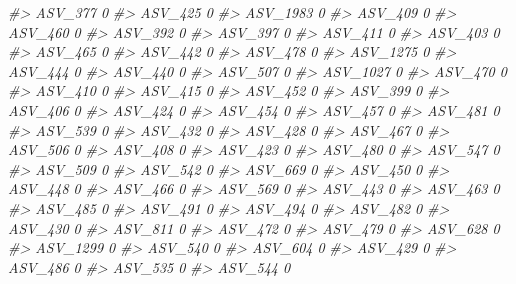 \documentclass[
]{article}
\newenvironment{Shaded}{\begin{snugshade}}{\end{snugshade}}
\newcommand{\CommentTok}[1]{\textcolor[rgb]{0.56,0.35,0.01}{\textit{#1}}}
\begin{document}
\begin{Shaded}
\begin{Highlighting}[]
\CommentTok{\#\textgreater{} ASV\_377   0}
\CommentTok{\#\textgreater{} ASV\_425   0}
\CommentTok{\#\textgreater{} ASV\_1983  0}
\CommentTok{\#\textgreater{} ASV\_409   0}
\CommentTok{\#\textgreater{} ASV\_460   0}
\CommentTok{\#\textgreater{} ASV\_392   0}
\CommentTok{\#\textgreater{} ASV\_397   0}
\CommentTok{\#\textgreater{} ASV\_411   0}
\CommentTok{\#\textgreater{} ASV\_403   0}
\CommentTok{\#\textgreater{} ASV\_465   0}
\CommentTok{\#\textgreater{} ASV\_442   0}
\CommentTok{\#\textgreater{} ASV\_478   0}
\CommentTok{\#\textgreater{} ASV\_1275  0}
\CommentTok{\#\textgreater{} ASV\_444   0}
\CommentTok{\#\textgreater{} ASV\_440   0}
\CommentTok{\#\textgreater{} ASV\_507   0}
\CommentTok{\#\textgreater{} ASV\_1027  0}
\CommentTok{\#\textgreater{} ASV\_470   0}
\CommentTok{\#\textgreater{} ASV\_410   0}
\CommentTok{\#\textgreater{} ASV\_415   0}
\CommentTok{\#\textgreater{} ASV\_452   0}
\CommentTok{\#\textgreater{} ASV\_399   0}
\CommentTok{\#\textgreater{} ASV\_406   0}
\CommentTok{\#\textgreater{} ASV\_424   0}
\CommentTok{\#\textgreater{} ASV\_454   0}
\CommentTok{\#\textgreater{} ASV\_457   0}
\CommentTok{\#\textgreater{} ASV\_481   0}
\CommentTok{\#\textgreater{} ASV\_539   0}
\CommentTok{\#\textgreater{} ASV\_432   0}
\CommentTok{\#\textgreater{} ASV\_428   0}
\CommentTok{\#\textgreater{} ASV\_467   0}
\CommentTok{\#\textgreater{} ASV\_506   0}
\CommentTok{\#\textgreater{} ASV\_408   0}
\CommentTok{\#\textgreater{} ASV\_423   0}
\CommentTok{\#\textgreater{} ASV\_480   0}
\CommentTok{\#\textgreater{} ASV\_547   0}
\CommentTok{\#\textgreater{} ASV\_509   0}
\CommentTok{\#\textgreater{} ASV\_542   0}
\CommentTok{\#\textgreater{} ASV\_669   0}
\CommentTok{\#\textgreater{} ASV\_450   0}
\CommentTok{\#\textgreater{} ASV\_448   0}
\CommentTok{\#\textgreater{} ASV\_466   0}
\CommentTok{\#\textgreater{} ASV\_569   0}
\CommentTok{\#\textgreater{} ASV\_443   0}
\CommentTok{\#\textgreater{} ASV\_463   0}
\CommentTok{\#\textgreater{} ASV\_485   0}
\CommentTok{\#\textgreater{} ASV\_491   0}
\CommentTok{\#\textgreater{} ASV\_494   0}
\CommentTok{\#\textgreater{} ASV\_482   0}
\CommentTok{\#\textgreater{} ASV\_430   0}
\CommentTok{\#\textgreater{} ASV\_811   0}
\CommentTok{\#\textgreater{} ASV\_472   0}
\CommentTok{\#\textgreater{} ASV\_479   0}
\CommentTok{\#\textgreater{} ASV\_628   0}
\CommentTok{\#\textgreater{} ASV\_1299  0}
\CommentTok{\#\textgreater{} ASV\_540   0}
\CommentTok{\#\textgreater{} ASV\_604   0}
\CommentTok{\#\textgreater{} ASV\_429   0}
\CommentTok{\#\textgreater{} ASV\_486   0}
\CommentTok{\#\textgreater{} ASV\_535   0}
\CommentTok{\#\textgreater{} ASV\_544   0}

\end{Highlighting}
\end{Shaded}
\end{document}
